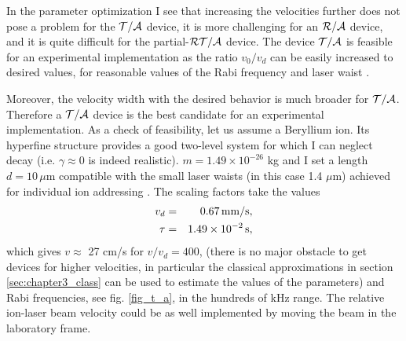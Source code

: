 In the parameter optimization I see that increasing the velocities further does not pose a problem for the ${\cal T/A}$
device, it is more challenging for an ${\cal R/A}$ device, and it is quite difficult for the partial-${\cal RT/A}$ device.  The device ${\cal T/A}$ is feasible for an experimental implementation  as the ratio $v_0/v_d$ can be easily increased to desired values, for  reasonable values of the
Rabi frequency and laser waist \cite{Zeyen2016}.

Moreover, the velocity width with the desired behavior is much broader for ${\cal T/A}$. Therefore a ${\cal T/A}$
device is the best candidate for
an experimental implementation.
As a check of feasibility, let us assume a Beryllium ion. Its hyperfine structure provides a good  two-level system
for which I can neglect decay (i.e. $\gamma\approx 0$ is indeed realistic). $m=1.49\times 10^{-26}$ kg
and I set a length $d=10\, \mu$m compatible with the small laser waists (in this case 1.4 $\mu$m) achieved for individual ion
addressing \cite{Zeyen2016}. The scaling factors take the values
%
\begin{eqnarray}
  v_d&=&0.67\, {\rm mm/s},
  \nonumber\\
  \tau&=&1.49\times 10^{-2}\, {\rm s},
  \nonumber
\end{eqnarray}
%
which gives  $v\approx$ 27 cm/s for $v/v_d=400$, (there is no major obstacle to get devices for higher velocities,
in particular the classical approximations in section \ref{sec:chapter3_class} can be used to  estimate the values of the parameters)
and Rabi frequencies, see fig. \ref{fig_t_a},  in the hundreds of kHz range. The relative ion-laser beam velocity could be as well
implemented  by moving the beam in the laboratory frame.

%
%
